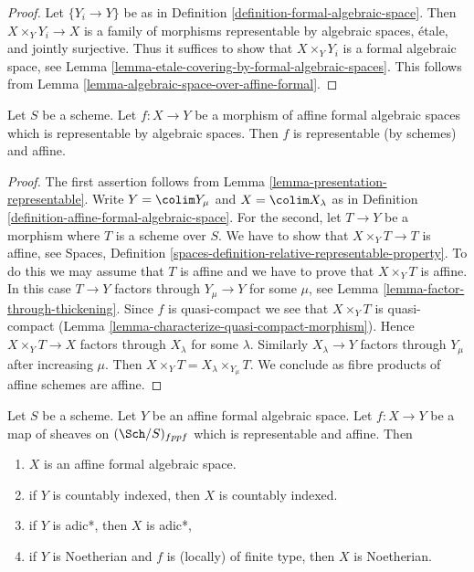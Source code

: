 \begin{proof}
Let $\{Y_i \to Y\}$ be as in
Definition \ref{definition-formal-algebraic-space}.
Then $X \times_Y Y_i \to X$ is a family of morphisms
representable by algebraic spaces, \'etale, and jointly
surjective. Thus it suffices to show that
$X \times_Y Y_i$ is a formal algebraic space, see
Lemma \ref{lemma-etale-covering-by-formal-algebraic-spaces}.
This follows from Lemma \ref{lemma-algebraic-space-over-affine-formal}.
\end{proof}

\begin{lemma}
\label{lemma-affine-representable-by-algebraic-spaces}
Let $S$ be a scheme. Let $f : X \to Y$ be a morphism of
affine formal algebraic spaces which is representable by
algebraic spaces. Then $f$ is representable (by schemes) and affine.
\end{lemma}

\begin{proof}
The first assertion follows from Lemma \ref{lemma-presentation-representable}.
Write $Y = \colim Y_\mu$ and $X = \colim X_\lambda$ as in
Definition \ref{definition-affine-formal-algebraic-space}.
For the second, let $T \to Y$ be a morphism where $T$ is a scheme
over $S$. We have to show that $X \times_Y T \to T$ is affine, see
Spaces, Definition \ref{spaces-definition-relative-representable-property}.
To do this we may assume that $T$ is affine and we have to prove
that $X \times_Y T$ is affine. In this case $T \to Y$ factors
through $Y_\mu \to Y$ for some $\mu$, see
Lemma \ref{lemma-factor-through-thickening}.
Since $f$ is quasi-compact we see that $X \times_Y T$ is
quasi-compact (Lemma \ref{lemma-characterize-quasi-compact-morphism}).
Hence $X \times_Y T \to X$ factors through $X_\lambda$ for some
$\lambda$. Similarly $X_\lambda \to Y$ factors through $Y_\mu$
after increasing $\mu$. Then
$X \times_Y T = X_\lambda \times_{Y_\mu} T$.
We conclude as fibre products of affine schemes are affine.
\end{proof}

\begin{lemma}
\label{lemma-property-goes-up-affine-morphism}
Let $S$ be a scheme. Let $Y$ be an affine formal algebraic space.
Let $f : X \to Y$ be a map of sheaves on $(\Sch/S)_{fppf}$ which
is representable and affine. Then
\begin{enumerate}
\item $X$ is an affine formal algebraic space.
\item if $Y$ is countably indexed, then $X$ is countably indexed.
\item if $Y$ is adic*, then $X$ is adic*,
\item if $Y$ is Noetherian and $f$ is (locally) of finite type, then
$X$ is Noetherian.
\end{enumerate}
\end{lemma}

